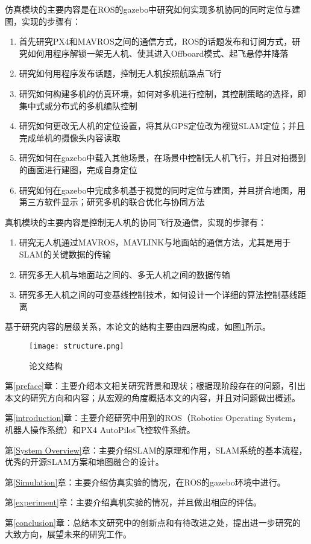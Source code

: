 仿真模块的主要内容是在ROS的gazebo中研究如何实现多机协同的同时定位与建图，实现的步骤有：

\begin{enumerate}
	\item 首先研究PX4和MAVROS之间的通信方式，ROS的话题发布和订阅方式，研究如何用程序解锁一架无人机、使其进入Offboard模式、起飞悬停并降落
	\item 研究如何用程序发布话题，控制无人机按照航路点飞行
	\item 研究如何构建多机的仿真环境，如何对多机进行控制，其控制策略的选择，即集中式或分布式的多机编队控制
	\item 研究如何更改无人机的定位设置，将其从GPS定位改为视觉SLAM定位；并且完成单机的摄像头内容读取
	\item 研究如何在gazebo中载入其他场景，在场景中控制无人机飞行，并且对拍摄到的画面进行建图，完成自身定位
	\item 研究如何在gazebo中完成多机基于视觉的同时定位与建图，并且拼合地图，用第三方软件显示；研究多机的联合优化与协同方法
\end{enumerate}

真机模块的主要内容是控制无人机的协同飞行及通信，实现的步骤有：

\begin{enumerate}
	\item 研究无人机通过MAVROS，MAVLINK与地面站的通信方法，尤其是用于SLAM的关键数据的传输
	\item 研究多无人机与地面站之间的、多无人机之间的数据传输
	\item 研究多无人机之间的可变基线控制技术，如何设计一个详细的算法控制基线距离
\end{enumerate}

基于研究内容的层级关系，本论文的结构主要由四层构成，如图\ref{fig1}所示。
\vspace{10pt}
\begin{figure}[!ht]
\centering
\texttt{[image: structure.png]}
\caption{论文结构 }
\label{fig1}
\end{figure}


第\ref{preface}章：主要介绍本文相关研究背景和现状；根据现阶段存在的问题，引出本文的研究方向和内容；从宏观的角度概括本文的内容，并且对问题做出概述。

第\ref{introduction}章：主要介绍研究中用到的ROS（Robotics Operating System，机器人操作系统）和PX4 AutoPilot飞控软件系统。

第\ref{System Overview}章：主要介绍SLAM的原理和作用，SLAM系统的基本流程，优秀的开源SLAM方案和地图融合的设计。

第\ref{Simulation}章：主要介绍仿真实验的情况，在ROS的gazebo环境中进行。

第\ref{experiment}章：主要介绍真机实验的情况，并且做出相应的评估。

第\ref{conclusion}章：总结本文研究中的创新点和有待改进之处，提出进一步研究的大致方向，展望未来的研究工作。

